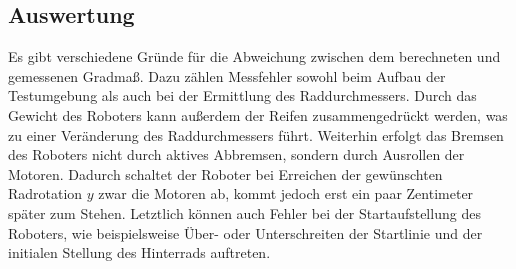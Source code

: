 \documentclass[ngerman]{tudscrreprt}
\begin{document}
\subsection{Auswertung}
Es gibt verschiedene Gründe für die Abweichung zwischen dem berechneten und gemessenen Gradmaß. Dazu zählen Messfehler sowohl beim Aufbau der Testumgebung als auch bei der Ermittlung des Raddurchmessers. Durch das Gewicht des Roboters kann außerdem der Reifen zusammengedrückt werden, was zu einer Veränderung des Raddurchmessers führt. Weiterhin erfolgt das Bremsen des Roboters nicht durch aktives Abbremsen, sondern durch Ausrollen der Motoren. Dadurch schaltet der Roboter bei Erreichen der gewünschten Radrotation $y$ zwar die Motoren ab, kommt jedoch erst ein paar Zentimeter später zum Stehen. Letztlich können auch Fehler bei der Startaufstellung des Roboters, wie beispielsweise Über- oder Unterschreiten der Startlinie und der initialen Stellung des Hinterrads auftreten.
\end{document}
